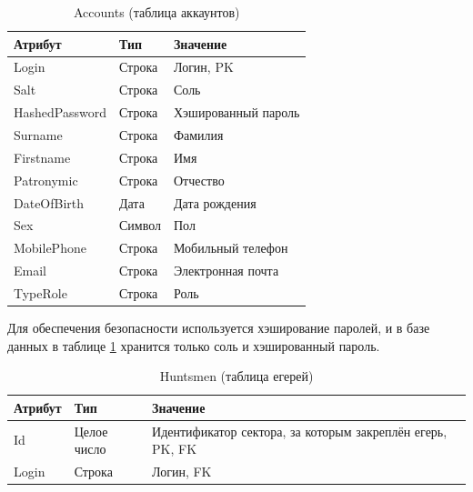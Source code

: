 	\begin{table}[pt!]
		\begin{center}
			\caption{Accounts (таблица аккаунтов)}
			\label{acc_table}
			\begin{tabular}{| p{3cm} | p{3cm} | p{8cm} |}
				\hline
				\textbf{Атрибут} 	& \textbf{Тип} & \textbf{Значение} \\
				\hline
				Login 				& Строка &	Логин, PK \\ 
				\hline
				Salt 				& Строка &	Соль  \\ 
				\hline
				HashedPassword 		& Строка &	Хэшированный пароль \\ 
				\hline
				Surname 			& Строка &	Фамилия \\ 
				\hline
				Firstname 			& Строка &	Имя \\ 
				\hline
				Patronymic 			& Строка &	Отчество \\ 
				\hline
				DateOfBirth 		& Дата &	Дата рождения \\ 
				\hline
				Sex 				& Символ &	Пол \\ 
				\hline
				MobilePhone 		& Строка &	Мобильный телефон \\ 
				\hline
				Email 				& Строка &	Электронная почта \\ 
				\hline
				TypeRole 			& Строка &	Роль \\ 
				\hline
			\end{tabular}
		\end{center}
	\end{table}

	Для обеспечения безопасности используется хэширование паролей, и в базе данных в таблице \ref{acc_table} хранится только соль и хэшированный пароль.\\

	\begin{table}[pt!] 
		\begin{center}
			\caption{Huntsmen (таблица егерей)}
			\label{huntsmen_table}
			\begin{tabular}{| p{3cm} | p{3cm} | p{8cm} |}
				\hline
				\textbf{Атрибут} 	& \textbf{Тип} & \textbf{Значение} \\
				\hline
				Id 					& Целое число &	Идентификатор сектора, за которым закреплён егерь, PK, FK \\
				\hline
				Login	 			& Строка &	Логин, FK \\ 
				\hline
			\end{tabular}
		\end{center}
	\end{table}

